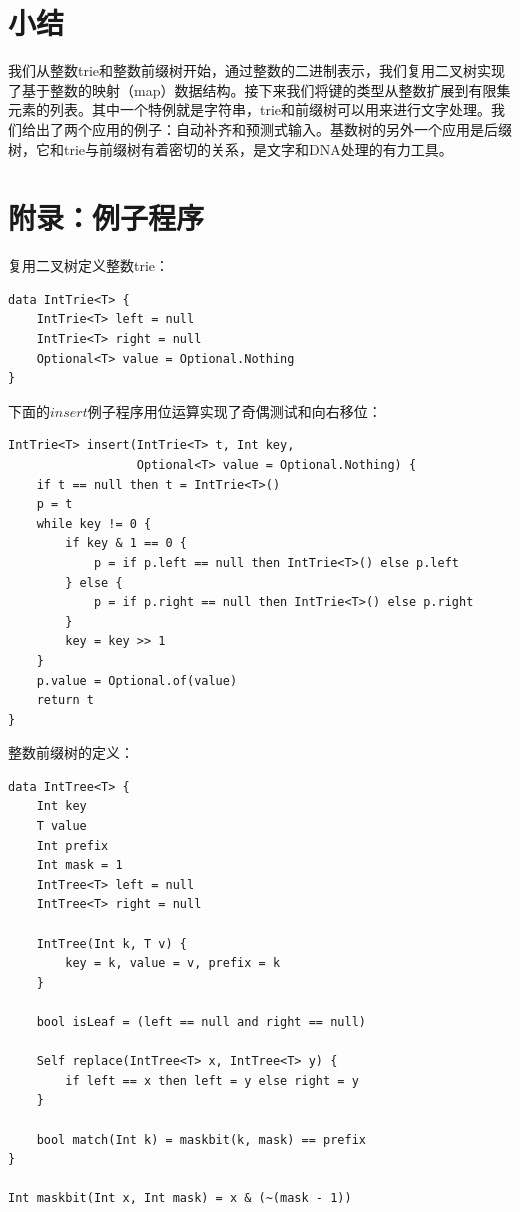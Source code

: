 \documentclass[b5paper]{ctexart}
\begin{document}
\section{小结}
我们从整数trie和整数前缀树开始，通过整数的二进制表示，我们复用二叉树实现了基于整数的映射（map）数据结构。接下来我们将键的类型从整数扩展到有限集元素的列表。其中一个特例就是字符串，trie和前缀树可以用来进行文字处理。我们给出了两个应用的例子：自动补齐和预测式输入。基数树的另外一个应用是后缀树，它和trie与前缀树有着密切的关系，是文字和DNA处理的有力工具。

\section{附录：例子程序}

复用二叉树定义整数trie：

\begin{lstlisting}[language = Bourbaki]
data IntTrie<T> {
    IntTrie<T> left = null
    IntTrie<T> right = null
    Optional<T> value = Optional.Nothing
}
\end{lstlisting}

下面的$insert$例子程序用位运算实现了奇偶测试和向右移位：

\begin{lstlisting}[language = Bourbaki]
IntTrie<T> insert(IntTrie<T> t, Int key,
                  Optional<T> value = Optional.Nothing) {
    if t == null then t = IntTrie<T>()
    p = t
    while key != 0 {
        if key & 1 == 0 {
            p = if p.left == null then IntTrie<T>() else p.left
        } else {
            p = if p.right == null then IntTrie<T>() else p.right
        }
        key = key >> 1
    }
    p.value = Optional.of(value)
    return t
}
\end{lstlisting}



整数前缀树的定义：

\begin{lstlisting}[language = Bourbaki]
data IntTree<T> {
    Int key
    T value
    Int prefix
    Int mask = 1
    IntTree<T> left = null
    IntTree<T> right = null

    IntTree(Int k, T v) {
        key = k, value = v, prefix = k
    }

    bool isLeaf = (left == null and right == null)

    Self replace(IntTree<T> x, IntTree<T> y) {
        if left == x then left = y else right = y
    }

    bool match(Int k) = maskbit(k, mask) == prefix
}

Int maskbit(Int x, Int mask) = x & (~(mask - 1))
\end{lstlisting}
\end{document}
